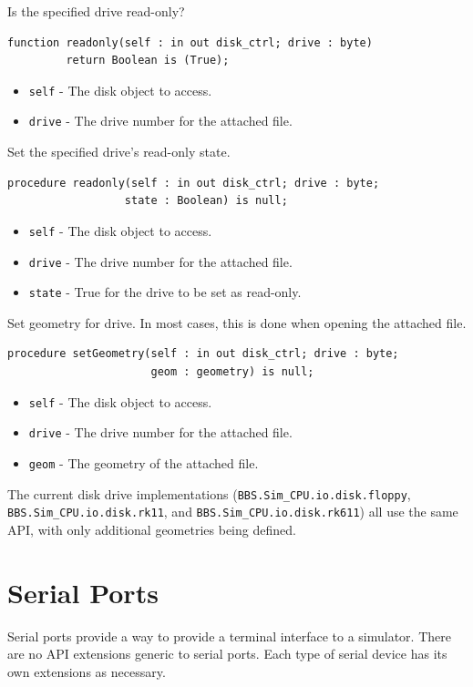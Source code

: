 \documentclass[10pt, openany]{book}
\newcommand{\package}[1]{\texttt{#1}}
\newcommand{\keyword}[1]{\texttt{#1}}
\begin{document}
Is the specified drive read-only?
\begin{lstlisting}
function readonly(self : in out disk_ctrl; drive : byte)
         return Boolean is (True);
\end{lstlisting}
\begin{itemize}
  \item \keyword{self} - The disk object to access.
  \item \keyword{drive} - The drive number for the attached file.
\end{itemize}

Set the specified drive's read-only state.
\begin{lstlisting}
procedure readonly(self : in out disk_ctrl; drive : byte;
                  state : Boolean) is null;
\end{lstlisting}
\begin{itemize}
  \item \keyword{self} - The disk object to access.
  \item \keyword{drive} - The drive number for the attached file.
  \item \keyword{state} - True for the drive to be set as read-only.
\end{itemize}

Set geometry for drive.  In most cases, this is done when opening the attached file.
\begin{lstlisting}
procedure setGeometry(self : in out disk_ctrl; drive : byte;
                      geom : geometry) is null;
\end{lstlisting}
\begin{itemize}
  \item \keyword{self} - The disk object to access.
  \item \keyword{drive} - The drive number for the attached file.
  \item \keyword{geom} - The geometry of the attached file.
\end{itemize}

The current disk drive implementations (\package{BBS.Sim\_CPU.io.disk.floppy}, \package{BBS.Sim\_CPU.io.disk.rk11}, and \package{BBS.Sim\_CPU.io.disk.rk611}) all use the same API, with only additional geometries being defined.

\section{Serial Ports}
Serial ports provide a way to provide a terminal interface to a simulator.
There are no API extensions generic to serial ports.
Each type of serial device has its own extensions as necessary.
\end{document}
